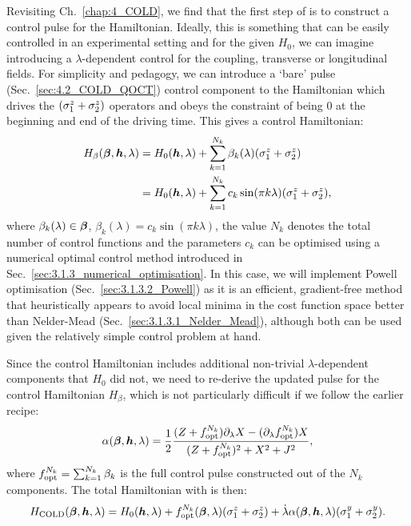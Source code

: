 Revisiting Ch.~\ref{chap:4_COLD}, we find that the first step of  is to construct a control pulse for the Hamiltonian. Ideally, this is something that can be easily controlled in an experimental setting and for the given $H_0$, we can imagine introducing a $\lambda$-dependent control for the coupling, transverse or longitudinal fields. For simplicity and pedagogy, we can introduce a `bare' pulse (Sec.~\ref{sec:4.2_COLD_QOCT}) control component to the Hamiltonian which drives the $(\sigma^z_1 + \sigma^z_2)$ operators and obeys the constraint of being $0$ at the beginning and end of the driving time. This gives a control Hamiltonian:
\begin{equation}\label{eq:COLD_twospin_controlH}
    \begin{aligned}
        H_\beta(\boldsymbol{\beta}, \boldsymbol{h}, \lambda) &= H_0(\boldsymbol{h}, \lambda) + \sum_{k=1}^{N_k} \beta_k(\lambda) (\sigma^z_{1} + \sigma^z_{2}) \\
        &= H_0(\boldsymbol{h}, \lambda) + \sum_{k=1}^{N_k} c_k \sin (\pi k \lambda) (\sigma^z_{1} + \sigma^z_{2}),
    \end{aligned}
\end{equation}
where $\beta_k(\lambda) \in \boldsymbol{\beta}$, $\beta_k(\lambda) = c_k \sin (\pi k \lambda)$, the value $N_k$ denotes the total number of control functions and the parameters $c_k$ can be optimised using a numerical optimal control method introduced in Sec.~\ref{sec:3.1.3_numerical_optimisation}. In this case, we will implement Powell optimisation (Sec.~\ref{sec:3.1.3.2_Powell}) as it is an efficient, gradient-free method that heuristically appears to avoid local minima in the cost function space better than Nelder-Mead (Sec.~\ref{sec:3.1.3.1_Nelder_Mead}), although both can be used given the relatively simple control problem at hand. 

Since the control Hamiltonian includes additional non-trivial $\lambda$-dependent components that $H_0$ did not, we need to re-derive the updated   pulse for the control Hamiltonian $H_{\beta}$, which is not particularly difficult if we follow the earlier recipe:
\begin{equation}\label{eq:twospin_alpha_COLD}
    \alpha(\boldsymbol{\beta}, \boldsymbol{h}, \lambda) = \frac{1}{2} \frac{(Z + f_{\rm opt}^{N_k}) \partial_{\lambda} X - (\partial_{\lambda} f_{\rm opt}^{N_k}) X}{(Z + f_{\rm opt}^{N_k})^2 + X^2 + J^2},
\end{equation}
where $f_{\rm opt}^{N_k} = \sum_{k=1}^{N_k} \beta_k$ is the full control pulse constructed out of the $N_k$ components. The total  Hamiltonian with   is then:
\begin{equation}\label{eq:twospin_COLD_Ham}
    H_{\rm COLD}(\boldsymbol{\beta}, \boldsymbol{h}, \lambda) = H_0(\boldsymbol{h}, \lambda) + f_{\rm opt}^{N_k}(\boldsymbol{\beta}, \lambda)(\sigma^z_1 + \sigma^z_2) + \dot{\lambda} \alpha(\boldsymbol{\beta}, \boldsymbol{h}, \lambda)(\sigma^y_1 + \sigma^y_2).
\end{equation}

